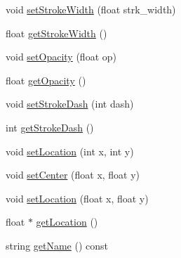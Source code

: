 \begin{DoxyCompactItemize}
\item 
void \hyperlink{classbridges_1_1datastructure_1_1_symbol_a56238a4535a26bc3eea698eea4b65921}{set\+Stroke\+Width} (float strk\+\_\+width)
\item 
float \hyperlink{classbridges_1_1datastructure_1_1_symbol_a4274feed56b8dfe89ffa3f791ece2ebd}{get\+Stroke\+Width} ()
\item 
void \hyperlink{classbridges_1_1datastructure_1_1_symbol_a889bace56d39df0ac09ba408ca868b7d}{set\+Opacity} (float op)
\item 
float \hyperlink{classbridges_1_1datastructure_1_1_symbol_af77f6e4c42ca97672888d863335b851a}{get\+Opacity} ()
\item 
void \hyperlink{classbridges_1_1datastructure_1_1_symbol_afd39d3b65d22bc2a1be64c8728f5e5d7}{set\+Stroke\+Dash} (int dash)
\item 
int \hyperlink{classbridges_1_1datastructure_1_1_symbol_a5fd32d1310c9ef97b07acab8efb17808}{get\+Stroke\+Dash} ()
\item 
void \hyperlink{classbridges_1_1datastructure_1_1_symbol_a9c62675b598fc5e755721576852f2dcf}{set\+Location} (int x, int y)
\item 
void \hyperlink{classbridges_1_1datastructure_1_1_symbol_a98a1c3d133e7fe2150d933495e421760}{set\+Center} (float x, float y)
\item 
void \hyperlink{classbridges_1_1datastructure_1_1_symbol_a4dbf51dac8b22b293a7061f5eb84b460}{set\+Location} (float x, float y)
\item 
float $\ast$ \hyperlink{classbridges_1_1datastructure_1_1_symbol_aeb4ec154605998d77dd9f96aa99ff16a}{get\+Location} ()
\item 
string \hyperlink{classbridges_1_1datastructure_1_1_symbol_a9365f8d91faf67e14ceaa89f8a5d0338}{get\+Name} () const
\end{DoxyCompactItemize}
